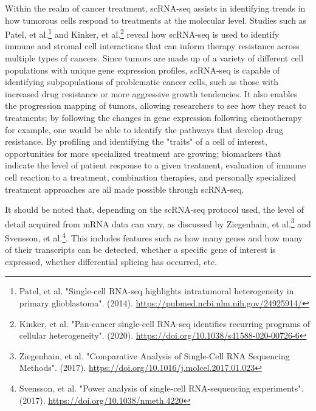 \documentclass{article}
\begin{document}
Within the realm of cancer treatment, scRNA-seq assists in identifying trends in how tumorous cells respond to treatments at the molecular level. Studies such as Patel, et al.\footnote{Patel, et al. "Single-cell RNA-seq highlights intratumoral heterogeneity in primary glioblastoma". (2014). \url{https://pubmed.ncbi.nlm.nih.gov/24925914/}} and Kinker, et al.\footnote{Kinker, et al. "Pan-cancer single-cell RNA-seq identifies recurring programs of cellular heterogeneity". (2020). \url{https://doi.org/10.1038/s41588-020-00726-6}} reveal how scRNA-seq is used to identify immune and stromal cell interactions that can inform therapy resistance across multiple types of cancers. Since tumors are made up of a variety of different cell populations with unique gene expression profiles, scRNA-seq is capable of identifying subpopulations of problematic cancer cells, such as those with increased drug resistance or more aggressive growth tendencies. It also enables the progression mapping of tumors, allowing researchers to see how they react to treatments; by following the changes in gene expression following chemotherapy for example, one would be able to identify the pathways that develop drug resistance. By profiling and identifying the "traits" of a cell of interest, opportunities for more specialized treatment are growing; biomarkers that indicate the level of patient response to a given treatment, evaluation of immune cell reaction to a treatment, combination therapies, and personally specialized treatment approaches are all made possible through scRNA-seq.


It should be noted that, depending on the scRNA-seq protocol used, the level of detail acquired from mRNA data can vary, as discussed by Ziegenhain, et al.\footnote{Ziegenhain, et al. "Comparative Analysis of Single-Cell RNA Sequencing Methods". (2017). \url{https://doi.org/10.1016/j.molcel.2017.01.023}} and Svensson, et al.\footnote{Svensson, et al. "Power analysis of single-cell RNA-sequencing experiments". (2017). \url{https://doi.org/10.1038/nmeth.4220}}. This includes features such as how many genes and how many of their transcripts can be detected, whether a specific gene of interest is expressed, whether differential splicing has occurred, etc.
\end{document}
